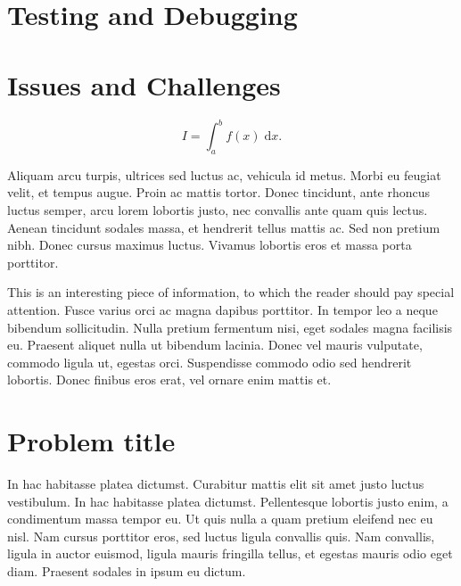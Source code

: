 \documentclass{article}
\begin{document}




\section{Testing and Debugging}



\section{Issues and Challenges}






\begin{equation}
	I = \int_{a}^{b} f(x) \; \text{d}x.
\end{equation}

Aliquam arcu turpis, ultrices sed luctus ac, vehicula id metus. Morbi eu feugiat velit, et tempus augue. Proin ac mattis tortor. Donec tincidunt, ante rhoncus luctus semper, arcu lorem lobortis justo, nec convallis ante quam quis lectus. Aenean tincidunt sodales massa, et hendrerit tellus mattis ac. Sed non pretium nibh. Donec cursus maximus luctus. Vivamus lobortis eros et massa porta porttitor.

\begin{info} %
	This is an interesting piece of information, to which the reader should pay special attention. Fusce varius orci ac magna dapibus porttitor. In tempor leo a neque bibendum sollicitudin. Nulla pretium fermentum nisi, eget sodales magna facilisis eu. Praesent aliquet nulla ut bibendum lacinia. Donec vel mauris vulputate, commodo ligula ut, egestas orci. Suspendisse commodo odio sed hendrerit lobortis. Donec finibus eros erat, vel ornare enim mattis et.
\end{info}


\section{Problem title} %

In hac habitasse platea dictumst. Curabitur mattis elit sit amet justo luctus vestibulum. In hac habitasse platea dictumst. Pellentesque lobortis justo enim, a condimentum massa tempor eu. Ut quis nulla a quam pretium eleifend nec eu nisl. Nam cursus porttitor eros, sed luctus ligula convallis quis. Nam convallis, ligula in auctor euismod, ligula mauris fringilla tellus, et egestas mauris odio eget diam. Praesent sodales in ipsum eu dictum.
\end{document}
